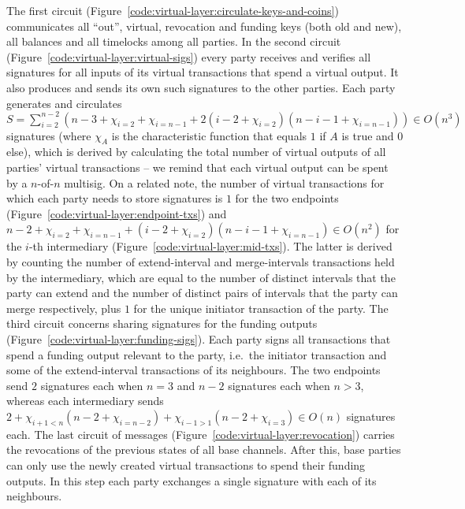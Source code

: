   The first circuit (Figure~\ref{code:virtual-layer:circulate-keys-and-coins})
  communicates all ``out'', virtual, revocation and funding keys (both old and new), all
  balances and all timelocks among all parties. In the second circuit
  (Figure~\ref{code:virtual-layer:virtual-sigs}) every party receives and
  verifies all signatures for all inputs of its virtual transactions that spend
  a virtual output. It also produces and sends its own such signatures to the
  other parties. Each party generates and circulates $S = \sum\limits_{i =
  2}^{n-2} (n-3 + \chi_{i = 2} + \chi_{i = n - 1} + 2(i - 2 + \chi_{i = 2})(n -
  i - 1 + \chi_{i = n - 1})) \in O(n^3)$ signatures (where $\chi_A$ is the
  characteristic function that equals $1$ if $A$ is true and $0$ else), which is
  derived by calculating the total number of virtual outputs of all parties'
  virtual transactions -- we remind that each virtual output can be spent by a
  $n$-of-$n$ multisig.
  On a related note, the number of virtual transactions for which each party
  needs to store signatures is $1$ for the two
  endpoints (Figure~\ref{code:virtual-layer:endpoint-txs}) and $n - 2 + \chi_{i
  = 2} + \chi_{i = n - 1} +  (i - 2 + \chi_{i = 2}) (n - i - 1 + \chi_{i = n-1})
  \in O(n^2)$ for the $i$-th intermediary
  (Figure~\ref{code:virtual-layer:mid-txs}). The latter is derived by counting
  the number of extend-interval and merge-intervals transactions held by the
  intermediary, which are equal to the number of distinct intervals that the
  party can extend and the number of distinct pairs of intervals that the party
  can merge respectively, plus $1$ for the unique initiator transaction of the
  party.
  The third circuit concerns sharing signatures for the funding outputs
  (Figure~\ref{code:virtual-layer:funding-sigs}). Each party signs all
  transactions that spend a funding output relevant to the party, i.e.\ the
  initiator transaction and some of the extend-interval transactions of its
  neighbours. The two endpoints send $2$ signatures each when $n = 3$ and $n -
  2$ signatures each when $n > 3$, whereas each intermediary sends $2 + \chi_{i
  + 1 < n}(n - 2 + \chi_{i = n - 2}) + \chi_{i - 1 > 1}(n - 2 + \chi_{i = 3})
  \in O(n)$ signatures each. The last circuit of messages
  (Figure~\ref{code:virtual-layer:revocation}) carries the revocations of the
  previous states of all base channels. After this, base parties can only use
  the newly created virtual transactions to spend their funding outputs. In this
  step each party exchanges a single signature with each of its neighbours.

